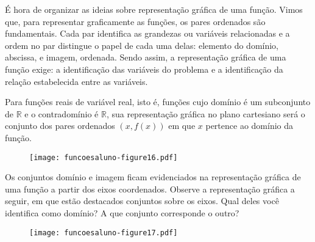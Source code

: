 \documentclass[extrafontsizes, twoside, 11pt, openright, final]{memoir}
\begin{document}
\label{\detokenize{AF106-5:sec-organizando-graficos}}\label{\detokenize{AF106-5:organizando-as-ideias-graficos}}\label{\detokenize{AF106-5::doc}}
É hora de organizar as ideias sobre representação gráfica de uma função. Vimos que, para representar graficamente as funções, os pares ordenados são fundamentais. Cada par identifica as grandezas ou variáveis relacionadas e a ordem no par distingue o papel de cada uma delas: elemento do domínio, abscissa, e imagem, ordenada. Sendo assim, a representação gráfica de uma função exige: a identificação das variáveis do problema e a identificação da relação estabelecida entre as variáveis.

Para funções reais de variável real, isto é, funções cujo domínio é um subconjunto de $\mathbb{R}$ e o contradomínio é $\mathbb{R}$, sua representação gráfica no plano cartesiano será o conjunto dos pares ordenados $(x,f(x))$ em que $x$ pertence ao domínio da função.

\begin{figure}[H]
	\begin{center}
		\centering

		\texttt{[image: funcoesaluno-figure16.pdf]}
	\end{center}
\end{figure}

\begin{reflection}

	Os conjuntos domínio e imagem ficam evidenciados na representação gráfica de uma  função a partir dos eixos coordenados. Observe a representação gráfica a seguir, em que estão destacados conjuntos sobre os eixos. Qual deles você identifica como domínio? A que conjunto corresponde o outro?
	\begin{figure}[H]
		\begin{center}
			\centering

			\texttt{[image: funcoesaluno-figure17.pdf]}
		\end{center}
	\end{figure}
\end{reflection}

\phantom{M}
\vspace{-1em}
\end{document}
